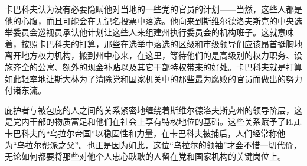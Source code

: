 卡巴科夫认为没有必要隐瞒他对当地的一些党的官员的计划——当然，这些人都是他的心腹，而且可能会在无记名投票中落选。他向来到斯维尔德洛夫斯克的中央选举委员会巡视员承认他计划让这些人来组建州执行委员会的机构班子。这就意味着，按照卡巴科夫的打算，那些在选举中落选的区级和市级领导们应该昂首挺胸地离开地方权力机构，搬到州中心来，在这里，等待他们的是高级别的权力职务、设施齐全的公寓、额外的现金补贴以及其它干部特权带来的好处。卡巴科夫就是打算如此轻率地让斯大林为了清除党和国家机关中的那些最为腐败的官员而做出的努力付诸东流。

庇护者与被包庇的人之间的关系紧密地缠绕着斯维尔德洛夫斯克州的领导阶层，这是党内干部的物质富足和他们在社会上享有特权地位的基础。这些关系赋予了И.Д.卡巴科夫的“乌拉尔帝国”以稳固性和力量，在卡巴科夫被捕后，人们经常称他为“乌拉尔帮派之父”。也正是因为如此，这位“乌拉尔的领袖”才会不惜一切代价，无论如何都要将那些对他个人忠心耿耿的人留在党和国家机构的关键岗位上。

